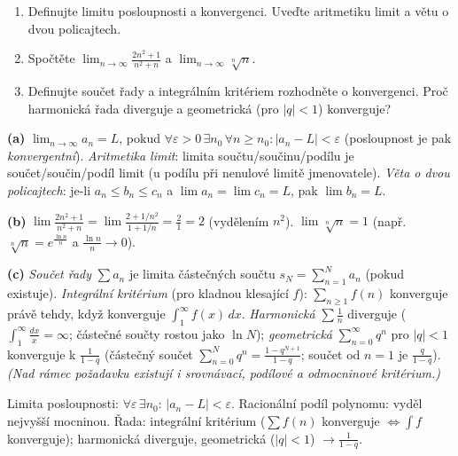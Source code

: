 \begin{zadani}
\begin{enumerate}[label=(\alph*)]
  \item {} Definujte limitu posloupnosti a konvergenci. Uveďte aritmetiku limit a větu o dvou policajtech.
  \item {} Spočtěte $\displaystyle\lim_{n\to\infty}\frac{2n^2+1}{n^2+n}$ a $\displaystyle\lim_{n\to\infty}\sqrt[n]{n}$.
  \item {} Definujte součet řady a integrálním kritériem rozhodněte o konvergenci. Proč harmonická řada diverguje a geometrická (pro $|q|<1$) konverguje?
\end{enumerate}
\end{zadani}

\begin{reseni}
\textbf{(a)} $\lim_{n\to\infty}a_n=L$, pokud $\forall\varepsilon>0\,\exists n_0\,\forall n\ge n_0:|a_n-L|<\varepsilon$ (posloupnost je pak \emph{konvergentní}). \emph{Aritmetika limit}: limita součtu/součinu/podílu je součet/součin/podíl limit (u podílu při nenulové limitě jmenovatele). \emph{Věta o dvou policajtech}: je-li $a_n\le b_n\le c_n$ a $\lim a_n=\lim c_n=L$, pak $\lim b_n=L$.

\textbf{(b)} $\lim\frac{2n^2+1}{n^2+n}=\lim\frac{2+1/n^2}{1+1/n}=\frac{2}{1}=2$ (vydělením $n^2$). $\lim\sqrt[n]{n}=1$ (např.\ $\sqrt[n]{n}=e^{\frac{\ln n}{n}}$ a $\frac{\ln n}{n}\to0$).

\textbf{(c)} \emph{Součet řady} $\sum a_n$ je limita částečných součtu $s_N=\sum_{n=1}^N a_n$ (pokud existuje). \emph{Integrální kritérium} (pro kladnou klesající $f$): $\sum_{n\ge1} f(n)$ konverguje právě tehdy, když konverguje $\int_1^\infty f(x)\,dx$. \emph{Harmonická} $\sum\frac1n$ diverguje ($\int_1^\infty\frac{dx}{x}=\infty$; částečné součty rostou jako $\ln N$); \emph{geometrická} $\sum_{n=0}^\infty q^n$ pro $|q|<1$ konverguje k $\frac{1}{1-q}$ (částečný součet $\sum_{n=0}^N q^n=\frac{1-q^{N+1}}{1-q}$; součet od $n=1$ je $\frac{q}{1-q}$). \emph{(Nad rámec požadavku existují i srovnávací, podílové a odmocninové kritérium.)}
\end{reseni}

\begin{jadro}
Limita posloupnosti: $\forall\varepsilon\,\exists n_0:\,|a_n-L|<\varepsilon$. Racionální podíl polynomu: vyděl nejvyšší mocninou. Řada: integrální kritérium ($\sum f(n)$ konverguje $\iff \int f$ konverguje); harmonická diverguje, geometrická ($|q|<1$) $\to\frac1{1-q}$.
\end{jadro}

